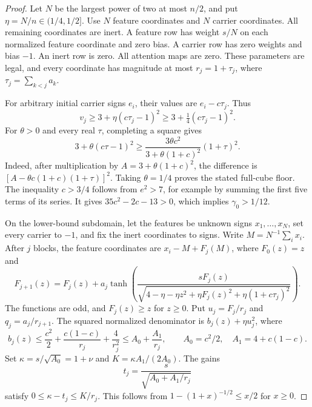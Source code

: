 \begin{proof}
Let $N$ be the largest power of two at most $n/2$, and put
$\eta=N/n\in(1/4,1/2]$. Use $N$ feature coordinates and $N$ carrier
coordinates. All remaining coordinates are inert. A feature row has
weight $s/N$ on each normalized feature coordinate and zero bias.
A carrier row has zero weights and bias $-1$. An inert row is zero.
All attention maps are zero. These parameters are legal, and every
coordinate has magnitude at most
$r_j=1+\tau_j$, where $\tau_j=\sum_{k<j}a_k$.

For arbitrary initial carrier signs $e_i$, their values are
$e_i-c\tau_j$. Thus
\[
 v_j\ge3+\eta(c\tau_j-1)^2
       \ge3+\tfrac14(c\tau_j-1)^2.
\]
For $\theta>0$ and every real $\tau$, completing a square gives
\begin{equation}
 3+\theta(c\tau-1)^2
 \ge\frac{3\theta c^2}{3+\theta(1+c)^2}(1+\tau)^2.
 \label{eq:pn-carrier-floor}
\end{equation}
Indeed, after multiplication by $A=3+\theta(1+c)^2$, the difference
is $[A-\theta c(1+c)(1+\tau)]^2$. Taking $\theta=1/4$ proves
the stated full-cube floor. The inequality $c>3/4$ follows from
$e^2>7$, for example by summing the first five terms of its series.
It gives $35c^2-2c-13>0$, which implies $\gamma_0>1/12$.

On the lower-bound subdomain, let the features be unknown signs
$x_1,\ldots,x_N$, set every carrier to $-1$, and fix the inert
coordinates to signs. Write $M=N^{-1}\sum_i x_i$. After $j$ blocks,
the feature coordinates are $x_i-M+F_j(M)$, where $F_0(z)=z$ and
\[
 F_{j+1}(z)=F_j(z)+a_j\tanh\!\left(
 \frac{sF_j(z)}{
 \sqrt{4-\eta-\eta z^2+\eta F_j(z)^2+
                      \eta(1+c\tau_j)^2}}\right).
\]
The functions are odd, and $F_j(z)\ge z$ for $z\ge0$. Put
$u_j=F_j/r_j$ and $q_j=a_j/r_{j+1}$. The squared normalized
denominator is $b_j(z)+\eta u_j^2$, where
\[
 b_j(z)\le\frac{c^2}{2}
       +\frac{c(1-c)}{r_j}+\frac4{r_j^2}
 \le A_0+\frac{A_1}{r_j},
 \qquad A_0=c^2/2,\quad A_1=4+c(1-c).
\]
Set $\kappa=s/\sqrt{A_0}=1+\nu$ and
$K=\kappa A_1/(2A_0)$. The gains
\[
 t_j=\frac{s}{\sqrt{A_0+A_1/r_j}}
\]
satisfy $0\le\kappa-t_j\le K/r_j$. This follows from
$1-(1+x)^{-1/2}\le x/2$ for $x\ge0$.


\end{proof}
